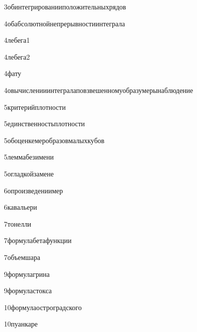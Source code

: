 {3}{обинтегрированииположительныхрядов}

{4}{обабсолютнойнепрерывностиинтеграла}

{4}{лебега1}

{4}{лебега2}

{4}{фату}

{4}{овычисленииинтегралаповзвешенномуобразумерынаблюдение}

{5}{критерийплотности}

{5}{единственностьплотности}

{5}{обоценкемеробразовмалыхкубов}

{5}{леммабезимени}

{5}{огладкойзамене}

{6}{опроизведениимер}

{6}{кавальери}

{7}{тонелли}

{7}{формулабетафункции}

{7}{объемшара}

{9}{формулагрина}

{9}{формуластокса}

{10}{формулаостроградского}

{10}{пуанкаре}

